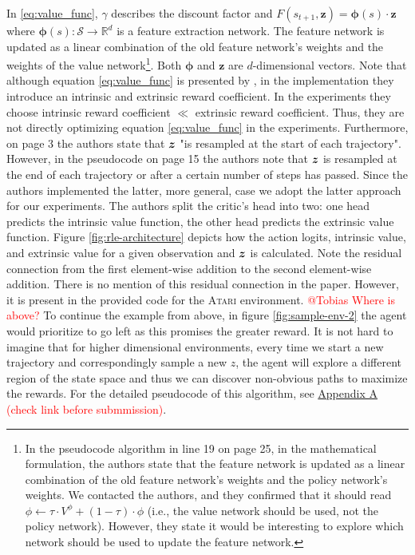 \documentclass[10pt]{article} %
\begin{document}
\noindent In \eqref{eq:value_func}, $\gamma$ describes the discount factor and $F(s_{t+1}, \textbf{z}) =  \boldsymbol{\phi}(s) \cdot \textbf{z}$ where $\boldsymbol{\phi}(s): \mathcal{S} \rightarrow \mathbb{R}^{d}$ is a feature extraction network. The feature network is updated as a linear combination of the old feature network's weights and the weights of the value network\footnote{In the pseudocode algorithm in line 19 on page 25, in the mathematical formulation, the authors state that the feature network is updated as a linear combination of the old feature network's weights and the policy network's weights. We contacted the authors, and they confirmed that it should read $\phi \leftarrow \tau \cdot V^\phi + (1 - \tau ) \cdot \phi$ (i.e., the value network should be used, not the policy network). However, they state it would be interesting to explore which network should be used to update the feature network.}. Both $\boldsymbol{\phi}$ and $\textbf{z}$ are $d$-dimensional vectors. Note that although equation \ref{eq:value_func} is presented by \cite{rle-paper}, in the implementation they introduce an intrinsic and extrinsic reward coefficient. In the experiments they choose intrinsic reward coefficient $\ll$ extrinsic reward coefficient. Thus, they are not directly optimizing equation \ref{eq:value_func} in the experiments. Furthermore, on page 3 the authors state that ${\bm{z}}$ "is resampled at the start of each trajectory". However, in the pseudocode on page 15 the authors note that ${\bm{z}}$ is resampled at the end of each trajectory or after a certain number of steps has passed. Since the authors implemented the latter, more general, case we adopt the latter approach for our experiments. The authors split the critic's head into two: one head predicts the intrinsic value function, the other head predicts the extrinsic value function. Figure \ref{fig:rle-architecture} depicts how the action logits, intrinsic value, and extrinsic value for a given observation and ${\bm{z}}$ is calculated. Note the residual connection from the first element-wise addition to the second element-wise addition. There is no mention of this residual connection in the paper. However, it is present in the provided code for the \textsc{Atari} environment. \textcolor{red}{@Tobias Where is above?} To continue the example from above, in figure \ref{fig:sample-env-2} the agent would prioritize to go left as this promises the greater reward. It is not hard to imagine that for higher dimensional environments, every time we start a new trajectory and correspondingly sample a new $z$, the agent will explore a different region of the state space and thus we can discover non-obvious paths to maximize the rewards. For the detailed pseudocode of this algorithm, see \hyperlink{algo-rle}{Appendix A} \textcolor{red}{(check link before submmission)}.
\end{document}
